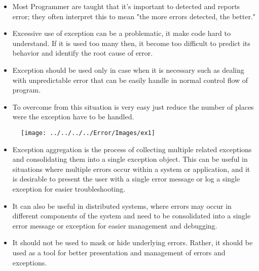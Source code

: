 \STANDARD{}
{ 
	
	\begin{itemize}
		\item Most Programmer are taught that it's important to detected and reports error; they often interpret this to mean "the more errors detected, the better."\\
		\item Excessive use of exception can be a problematic, it make code hard to understand. If it is used too many then, it become too difficult to predict its behavior and identify the root cause of error.\\
		\item Exception should be used only in case when it is necessary such as dealing with unpredictable error that can be easily handle in normal control flow of program.\\
		\item To overcome from this situation is very easy just reduce the number of places were the exception have to be handled.\\
	\end{itemize}


}
\begin{figure}
	\centering
	\texttt{[image: ../../../../Error/Images/ex1]}
	\caption{}
\end{figure}



\STANDARD{}
{ 

}



\STANDARD{}
{ 

  \begin{itemize}
  	\item Exception aggregation is the process of collecting multiple related exceptions and consolidating them into a single exception object. This can be useful in situations where multiple errors occur within a system or application, and it is desirable to present the user with a single error message or log a single exception for easier troubleshooting.\\ 
  	
  	\item It can also be useful in distributed systems, where errors may occur in different components of the system and need to be consolidated into a single error message or exception for easier management and debugging.\\ 
  	
  	\item It should not be used to mask or hide underlying errors. Rather, it should be used as a tool for better presentation and management of errors and exceptions.\\
  \end{itemize}
}

